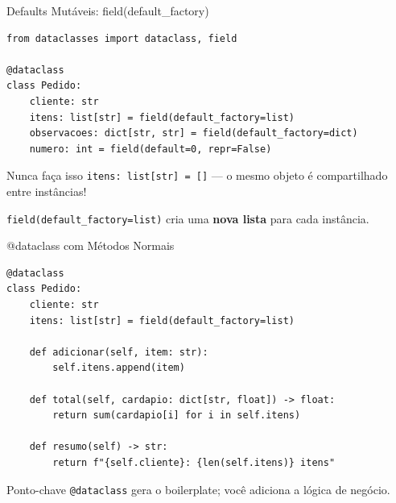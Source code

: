 \documentclass[aspectratio=169]{beamer}
\begin{document}
\begin{frame}[fragile]{Defaults Mutáveis: field(default\_factory)}
\begin{lstlisting}
from dataclasses import dataclass, field

@dataclass
class Pedido:
    cliente: str
    itens: list[str] = field(default_factory=list)
    observacoes: dict[str, str] = field(default_factory=dict)
    numero: int = field(default=0, repr=False)
\end{lstlisting}

\begin{alertblock}{Nunca faça isso}
\texttt{itens: list[str] = []} --- o mesmo objeto é compartilhado entre instâncias!
\end{alertblock}

\texttt{field(default\_factory=list)} cria uma \textbf{nova lista} para cada instância.
\end{frame}

\begin{frame}[fragile,shrink=5]{@dataclass com Métodos Normais}
\begin{lstlisting}
@dataclass
class Pedido:
    cliente: str
    itens: list[str] = field(default_factory=list)

    def adicionar(self, item: str):
        self.itens.append(item)

    def total(self, cardapio: dict[str, float]) -> float:
        return sum(cardapio[i] for i in self.itens)

    def resumo(self) -> str:
        return f"{self.cliente}: {len(self.itens)} itens"
\end{lstlisting}

\begin{exampleblock}{Ponto-chave}
\texttt{@dataclass} gera o boilerplate; você adiciona a lógica de negócio.
\end{exampleblock}
\end{frame}
\end{document}
